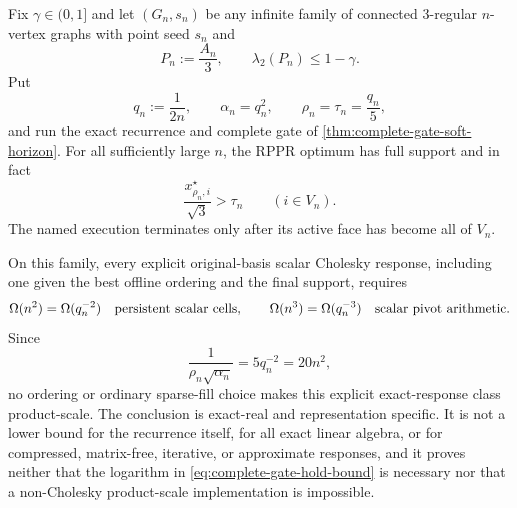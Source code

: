 \begin{proposition}
\label{prop:complete-gate-explicit-cholesky-expander-stop}
Fix $\gamma\in(0,1]$ and let $(G_n,s_n)$ be any infinite family of connected
$3$-regular $n$-vertex graphs with point seed $s_n$ and
\begin{equation}
 P_n:=\frac{A_n}{3},
 \qquad \lambda_2(P_n)\leq1-\gamma.
 \label{eq:complete-gate-expander-gap}
\end{equation}
Put
\begin{equation}
 q_n:=\frac1{2n},
 \qquad \alpha_n=q_n^2,
 \qquad \rho_n=\tau_n=\frac{q_n}{5},
 \label{eq:complete-gate-expander-scale}
\end{equation}
and run the exact recurrence and complete gate of
\cref{thm:complete-gate-soft-horizon}.  For all sufficiently large $n$,
the RPPR optimum has full support and in fact
\begin{equation}
 \frac{x_{\rho_n,i}^\star}{\sqrt3}>\tau_n
 \qquad(i\in V_n).
 \label{eq:complete-gate-expander-rppr-margin}
\end{equation}
The named execution terminates only after its active face has become all of
$V_n$.

On this family, every explicit original-basis scalar Cholesky response,
including one given the best offline ordering and the final support, requires
\begin{equation}
 \Omega(n^2)=\Omega(q_n^{-2})
 \quad\hbox{persistent scalar cells},
 \qquad
 \Omega(n^3)=\Omega(q_n^{-3})
 \quad\hbox{scalar pivot arithmetic}.
 \label{eq:complete-gate-expander-cholesky-lower}
\end{equation}
Since
\begin{equation}
 \frac1{\rho_n\sqrt{\alpha_n}}=5q_n^{-2}=20n^2,
 \label{eq:complete-gate-expander-product-scale}
\end{equation}
no ordering or ordinary sparse-fill choice makes this explicit exact-response
class product-scale.  The conclusion is exact-real and representation
specific.  It is not a lower bound for the recurrence itself, for all exact
linear algebra, or for compressed, matrix-free, iterative, or approximate
responses, and it proves neither that the logarithm in
\cref{eq:complete-gate-hold-bound} is necessary nor that a non-Cholesky
product-scale implementation is impossible.
\end{proposition}

